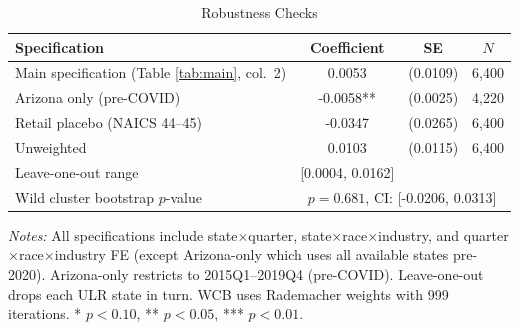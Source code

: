\begin{table}[t]
\centering
\caption{Robustness Checks}
\label{tab:robustness}
\begin{threeparttable}
\begin{tabular}{lccc}
\toprule
Specification & Coefficient & SE & $N$ \\
\midrule
Main specification (Table \ref{tab:main}, col.~2) & 0.0053 & (0.0109) & 6,400 \\
Arizona only (pre-COVID) & -0.0058** & (0.0025) & 4,220 \\
Retail placebo (NAICS 44--45) & -0.0347 & (0.0265) & 6,400 \\
Unweighted & 0.0103 & (0.0115) & 6,400 \\
Leave-one-out range & [0.0004, 0.0162] & & \\
Wild cluster bootstrap $p$-value & \multicolumn{3}{c}{$p = 0.681$, CI: [-0.0206, 0.0313]} \\
\bottomrule
\end{tabular}
\begin{tablenotes}[flushleft]\small
\item \textit{Notes:} All specifications include state$\times$quarter, state$\times$race$\times$industry, and quarter$\times$race$\times$industry FE (except Arizona-only which uses all available states pre-2020). Arizona-only restricts to 2015Q1--2019Q4 (pre-COVID). Leave-one-out drops each ULR state in turn. WCB uses Rademacher weights with 999 iterations. * $p<0.10$, ** $p<0.05$, *** $p<0.01$.
\end{tablenotes}
\end{threeparttable}
\end{table}

